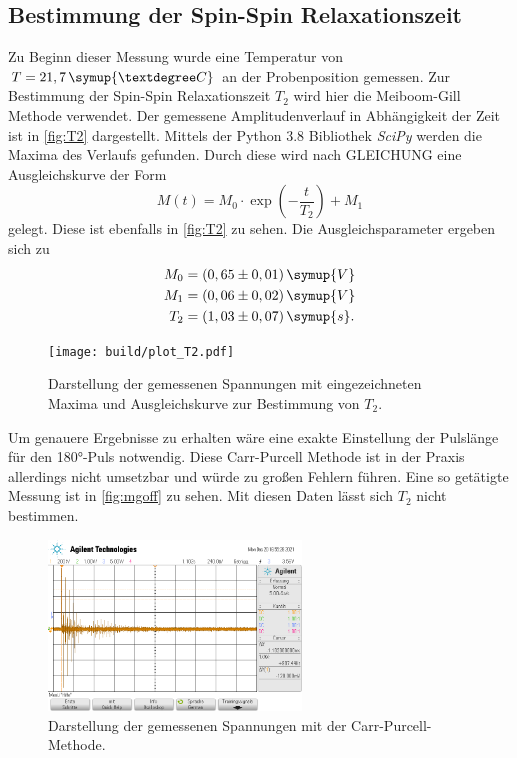 \subsection{Bestimmung der Spin-Spin Relaxationszeit}
Zu Beginn dieser Messung wurde eine Temperatur von $T = 21,7 \, \symup{°C}$ an der Probenposition gemessen.
Zur Bestimmung der Spin-Spin Relaxationszeit $T_2$ wird hier die Meiboom-Gill Methode verwendet.
Der gemessene Amplitudenverlauf in Abhängigkeit der Zeit ist in \autoref{fig:T2} dargestellt.
Mittels der Python 3.8 Bibliothek \textit{SciPy}\cite{scipy} werden die Maxima des Verlaufs gefunden.
Durch diese wird nach GLEICHUNG eine Ausgleichskurve der Form 
\begin{equation*}
    M(t) = M_0 \cdot \exp \left(-\frac{t}{T_2} \right) + M_1
\end{equation*}
gelegt. Diese ist ebenfalls in \autoref{fig:T2} zu sehen.
Die Ausgleichsparameter ergeben sich zu 
\begin{align*}
    M_0 &= (0,65 \pm 0,01) \, \symup{V}\\
    M_1 &= (0,06 \pm 0,02) \, \symup{V}\\
    T_2 &= (1,03 \pm 0,07) \, \symup{s}.
\end{align*}
\begin{figure}
    \centering
    \texttt{[image: build/plot\_T2.pdf]}
    \caption{Darstellung der gemessenen Spannungen mit eingezeichneten Maxima und Ausgleichskurve zur Bestimmung von $T_2$.}
    \label{fig:T2}
\end{figure}
Um genauere Ergebnisse zu erhalten wäre eine exakte Einstellung der Pulslänge für den 180°-Puls notwendig.
Diese Carr-Purcell Methode ist in der Praxis allerdings nicht umsetzbar und würde zu großen Fehlern führen.
Eine so getätigte Messung ist in \autoref{fig:mgoff}
zu sehen. Mit diesen Daten lässt sich $T_2$ nicht bestimmen.
\begin{figure}
    \centering
    \includegraphics[width=0.6\textwidth]{data/ohnemg.png}
    \caption{Darstellung der gemessenen Spannungen mit der Carr-Purcell-Methode.}
    \label{fig:mgoff}
\end{figure}

